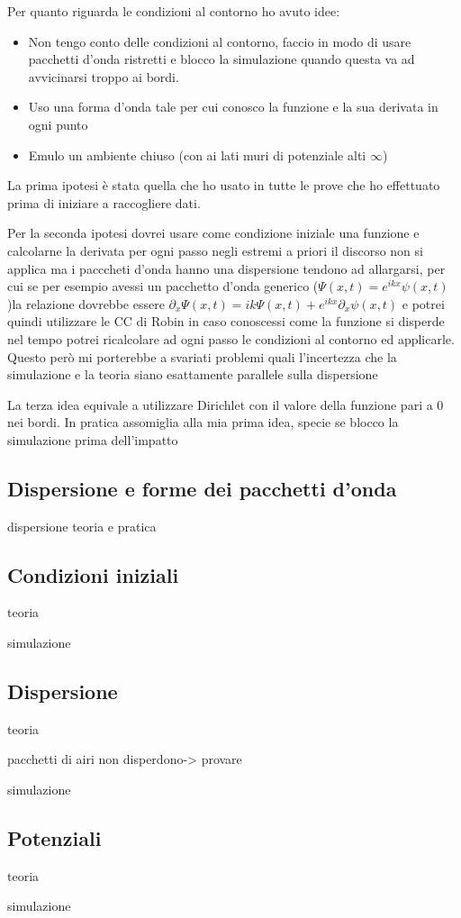 Per quanto riguarda le condizioni al contorno ho avuto idee:
\begin{itemize}
	\item Non tengo conto delle condizioni al contorno, faccio in modo di usare pacchetti d'onda ristretti e blocco la simulazione quando questa va ad  avvicinarsi troppo ai bordi.
	\item Uso una forma d'onda tale per cui conosco la funzione e la sua derivata in ogni punto
	\item Emulo un ambiente chiuso (con ai lati muri di potenziale alti $\infty$)
\end{itemize}
La prima ipotesi \`e stata quella che ho usato in tutte le prove che ho effettuato prima di iniziare a raccogliere dati.

Per la seconda ipotesi dovrei usare come condizione iniziale una funzione e calcolarne la derivata per ogni passo negli estremi a priori il discorso non si applica ma i pacccheti d'onda hanno una dispersione tendono ad allargarsi, per cui se  per esempio avessi un pacchetto d'onda generico ($\Psi(x,t) = e^{ikx} \psi(x,t)$)la relazione dovrebbe essere $\partial_x \Psi(x,t) = ik \Psi(x,t) + e^{ikx}\partial_x\psi(x,t)$ e potrei quindi utilizzare le CC di Robin in caso conoscessi come la funzione si disperde nel tempo potrei ricalcolare ad ogni passo le condizioni al contorno ed applicarle. Questo per\`o mi porterebbe a svariati problemi quali l'incertezza che la simulazione e la teoria siano esattamente parallele sulla dispersione 

La terza idea equivale a utilizzare Dirichlet con il valore della funzione pari a 0 nei bordi. In pratica assomiglia alla mia prima idea, specie se blocco la simulazione prima dell'impatto

\subsection{Dispersione e forme dei pacchetti d'onda}
dispersione teoria e pratica
\subsection{Condizioni iniziali}
teoria

simulazione
\subsection{Dispersione}
teoria

pacchetti di airi non disperdono-> provare

simulazione
\subsection{Potenziali}
teoria

simulazione